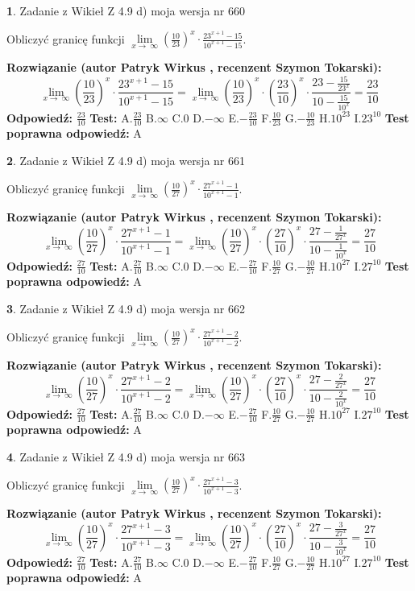 \documentclass[12pt, a4paper]{article}
\theoremstyle{definition} %
\newtheorem{zad}{}
\newcommand{\zadStart}[1]{\begin{zad}#1\newline}
\newcommand{\zadStop}{\end{zad}}
\newcommand{\rozwStart}[2]{\noindent \textbf{Rozwiązanie (autor #1 , recenzent #2): }\newline}
\newcommand{\rozwStop}{\newline}
\newcommand{\odpStart}{\noindent \textbf{Odpowiedź:}\newline}
\newcommand{\odpStop}{\newline}
\newcommand{\testStart}{\noindent \textbf{Test:}\newline}
\newcommand{\testStop}{\newline}
\newcommand{\kluczStart}{\noindent \textbf{Test poprawna odpowiedź:}\newline}
\newcommand{\kluczStop}{\newline}
\begin{document}
\zadStart{Zadanie z Wikieł Z 4.9 d) moja wersja nr 660}


Obliczyć granicę funkcji  $\lim\limits_{x\to\ \infty}(\frac{10}{23})^{x}\cdot\frac{23^{x+1}-15}{10^{x+1}-15}$.
\zadStop
\rozwStart{Patryk Wirkus}{Szymon Tokarski}
$$\lim\limits_{x\to\ \infty}(\frac{10}{23})^{x}\cdot\frac{23^{x+1}-15}{10^{x+1}-15}=\lim\limits_{x\to\ \infty}(\frac{10}{23})^{x}\cdot(\frac{23}{10})^{x} \cdot \frac{23-\frac{15}{23^{x}}}{10-\frac{15}{10^{x}}} = \frac{23}{10}$$
\rozwStop
\odpStart
$\frac{23}{10}$
\odpStop
\testStart
A.$\frac{23}{10}$ B.$\infty$ C.$0$ D.$-\infty$ E.$-\frac{23}{10}$
F.$\frac{10}{23}$ G.$-\frac{10}{23}$
H.$10^{23}$
I.$23^{10}$
\testStop
\kluczStart
A
\kluczStop



\zadStart{Zadanie z Wikieł Z 4.9 d) moja wersja nr 661}


Obliczyć granicę funkcji  $\lim\limits_{x\to\ \infty}(\frac{10}{27})^{x}\cdot\frac{27^{x+1}-1}{10^{x+1}-1}$.
\zadStop
\rozwStart{Patryk Wirkus}{Szymon Tokarski}
$$\lim\limits_{x\to\ \infty}(\frac{10}{27})^{x}\cdot\frac{27^{x+1}-1}{10^{x+1}-1}=\lim\limits_{x\to\ \infty}(\frac{10}{27})^{x}\cdot(\frac{27}{10})^{x} \cdot \frac{27-\frac{1}{27^{x}}}{10-\frac{1}{10^{x}}} = \frac{27}{10}$$
\rozwStop
\odpStart
$\frac{27}{10}$
\odpStop
\testStart
A.$\frac{27}{10}$ B.$\infty$ C.$0$ D.$-\infty$ E.$-\frac{27}{10}$
F.$\frac{10}{27}$ G.$-\frac{10}{27}$
H.$10^{27}$
I.$27^{10}$
\testStop
\kluczStart
A
\kluczStop



\zadStart{Zadanie z Wikieł Z 4.9 d) moja wersja nr 662}


Obliczyć granicę funkcji  $\lim\limits_{x\to\ \infty}(\frac{10}{27})^{x}\cdot\frac{27^{x+1}-2}{10^{x+1}-2}$.
\zadStop
\rozwStart{Patryk Wirkus}{Szymon Tokarski}
$$\lim\limits_{x\to\ \infty}(\frac{10}{27})^{x}\cdot\frac{27^{x+1}-2}{10^{x+1}-2}=\lim\limits_{x\to\ \infty}(\frac{10}{27})^{x}\cdot(\frac{27}{10})^{x} \cdot \frac{27-\frac{2}{27^{x}}}{10-\frac{2}{10^{x}}} = \frac{27}{10}$$
\rozwStop
\odpStart
$\frac{27}{10}$
\odpStop
\testStart
A.$\frac{27}{10}$ B.$\infty$ C.$0$ D.$-\infty$ E.$-\frac{27}{10}$
F.$\frac{10}{27}$ G.$-\frac{10}{27}$
H.$10^{27}$
I.$27^{10}$
\testStop
\kluczStart
A
\kluczStop



\zadStart{Zadanie z Wikieł Z 4.9 d) moja wersja nr 663}


Obliczyć granicę funkcji  $\lim\limits_{x\to\ \infty}(\frac{10}{27})^{x}\cdot\frac{27^{x+1}-3}{10^{x+1}-3}$.
\zadStop
\rozwStart{Patryk Wirkus}{Szymon Tokarski}
$$\lim\limits_{x\to\ \infty}(\frac{10}{27})^{x}\cdot\frac{27^{x+1}-3}{10^{x+1}-3}=\lim\limits_{x\to\ \infty}(\frac{10}{27})^{x}\cdot(\frac{27}{10})^{x} \cdot \frac{27-\frac{3}{27^{x}}}{10-\frac{3}{10^{x}}} = \frac{27}{10}$$
\rozwStop
\odpStart
$\frac{27}{10}$
\odpStop
\testStart
A.$\frac{27}{10}$ B.$\infty$ C.$0$ D.$-\infty$ E.$-\frac{27}{10}$
F.$\frac{10}{27}$ G.$-\frac{10}{27}$
H.$10^{27}$
I.$27^{10}$
\testStop
\kluczStart
A
\kluczStop
\end{document}
